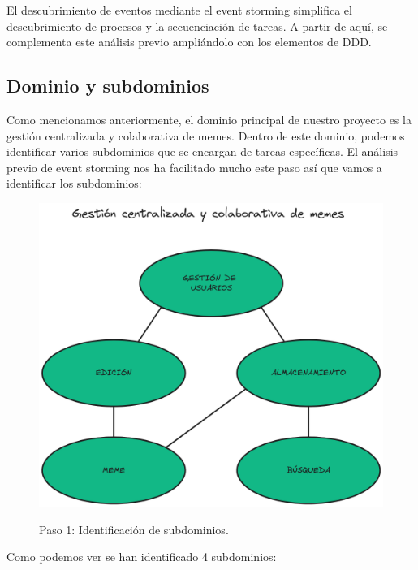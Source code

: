 El descubrimiento de eventos mediante el event storming simplifica el descubrimiento de procesos y la secuenciación de tareas. A partir de aquí, se complementa este análisis previo ampliándolo con los elementos de DDD.

\subsection{Dominio y subdominios}

Como mencionamos anteriormente, el dominio principal de nuestro proyecto es la gestión centralizada y colaborativa de memes. Dentro de este dominio, podemos identificar varios subdominios que se encargan de tareas específicas. El análisis previo de event storming nos ha facilitado mucho este paso así que vamos a identificar los subdominios:

\begin{figure}[H]
    \caption{Paso 1: Identificación de subdominios.}
    \centering
    \vspace*{0.5cm}
    \includegraphics[scale=0.2]{figuras/paso1.png}\label{fig:figuras/paso1.png}
\end{figure}

Como podemos ver se han identificado 4 subdominios:


